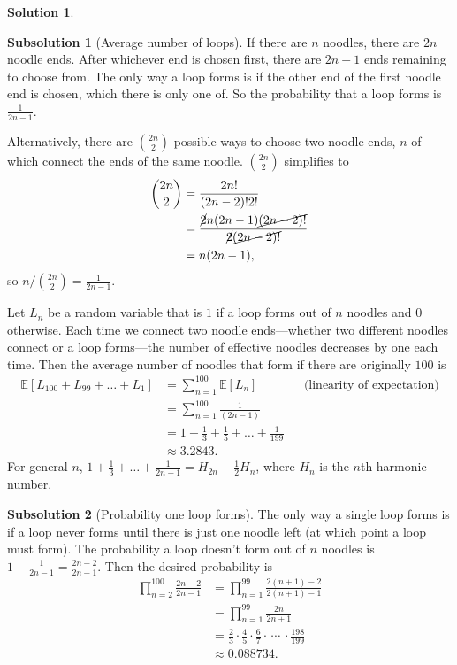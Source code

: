 \documentclass{article}
\theoremstyle{definition}
\newtheorem{sol}{Solution}
\newtheorem*{subsol}{Subsolution}
\theoremstyle{plain}
\newcommand{\Exp}[1]{\mathbb{E}\left[#1\right]}
\begin{document}
\begin{sol}
\begin{subsol}[Average number of loops]
If there are $n$ noodles, there are $2n$ noodle ends. After whichever end is chosen first, there are $2n-1$ ends remaining to choose from. The only way a loop forms is if the other end of the first noodle end is chosen, which there is only one of. So the probability that a loop forms is
$\frac{1}{2n-1}$.

Alternatively, there are $2n \choose 2$ possible ways to choose two noodle ends, $n$ of which connect the ends of the same noodle. $2n \choose 2$ simplifies to
\begin{align*}
{2n \choose 2} &= \frac{2n!}{(2n-2)!2!} \\
&= \frac{\cancel{2}n (2n-1) \cancel{(2n-2)!}}{\cancel{2}\cancel{(2n-2)!}} \\
&= n (2n-1),
\end{align*}
so $n / {2n \choose 2} = \frac{1}{2n-1}$.

Let $L_n$ be a random variable that is $1$ if a loop forms out of $n$ noodles and $0$ otherwise. Each time we connect two noodle ends---whether two different noodles connect or a loop forms---the number of effective noodles decreases by one each time. Then the average number of noodles that form if there are originally $100$ is
\begin{align*}
\Exp{L_{100} + L_{99} + \dots + L_{1}} & = \sum_{n=1}^{100}\Exp{L_n} && \text{(linearity of expectation)}\\ 
& = \sum_{n=1}^{100} \frac{1}{(2n-1)} \\
& = 1 + \frac{1}{3} + \frac{1}{5} + \dots + \frac{1}{199} \\
& \approx 3.2843.
\end{align*}
For general $n$, $1 + \frac{1}{3} + \dots + \frac{1}{2n-1} = H_{2n} - \frac{1}{2}H_n$, where $H_n$ is the $n$th harmonic number.
\end{subsol}

\begin{subsol}[Probability one loop forms]
The only way a single loop forms is if a loop never forms until there is just one noodle left (at which point a loop must form). The probability a loop doesn't form out of $n$ noodles is $1 - \frac{1}{2n-1} = \frac{2n-2}{2n-1}$. Then the desired probability is
\begin{align*}
\prod_{n=2}^{100} \frac{2n-2}{2n-1} &= \prod_{n=1}^{99} \frac{2(n+1)-2}{2(n+1)-1} \\
&= \prod_{n=1}^{99} \frac{2n}{2n+1} \\
&= \frac{2}{3} \cdot \frac{4}{5} \cdot \frac{6}{7} \cdot \, \cdots \, \cdot \frac{198}{199} \\
&\approx 0.088734.
\end{align*}
\end{subsol}
\end{sol}
\end{document}
